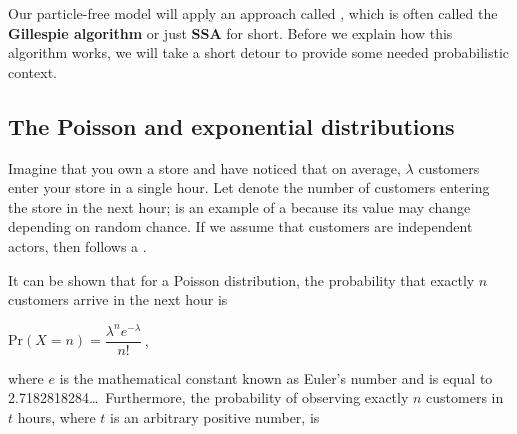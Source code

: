 \begin{note}\end{note}

Our particle-free model will apply an approach called , which is often called the \textbf{Gillespie algorithm} or just \textbf{SSA} for short. Before we explain how this algorithm works, we will take a short detour to provide some needed probabilistic context.

\FloatBarrier
{}
\subsection{The Poisson and exponential distributions}

Imagine that you own a store and have noticed that on average, $\lambda$ customers enter your store in a single hour. Let  denote the number of customers entering the store in the next hour;  is an example of a  because its value may change depending on random chance. If we assume that customers are independent actors, then  follows a .

It can be shown that for a Poisson distribution, the probability that exactly $n$ customers arrive in the next hour is

\begin{center}
$\mathrm{Pr}(X = n) = \dfrac{\lambda^n e^{-\lambda}}{n!}$\,,
\end{center}

\noindent where $e$ is the mathematical constant known as Euler's number and is equal to 2.7182818284\ldots~Furthermore, the probability of observing exactly $n$ customers in $t$ hours, where $t$ is an arbitrary positive number, is

